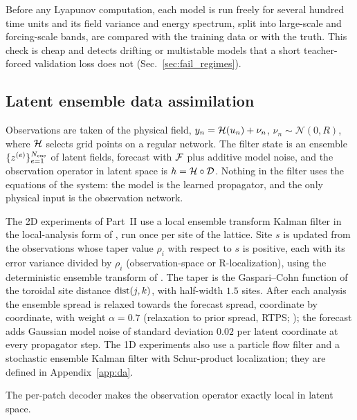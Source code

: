 Before any Lyapunov computation, each model is run freely for several
hundred time units and its field variance and energy spectrum, split
into large-scale and forcing-scale bands, are compared with the training
data or with the truth.
This check is cheap and detects drifting or multistable models that a
short teacher-forced validation loss does not (Sec.~\ref{sec:fail_regimes}).

\subsection{Latent ensemble data assimilation}
\label{sec:da_method}

Observations are taken of the physical field,
$y_n = \mathcal{H}(u_n) + \nu_n$, $\nu_n\sim\mathcal{N}(0,R)$, where $\mathcal{H}$
selects grid points on a regular network. The filter state is an
ensemble $\{z^{(e)}\}_{e=1}^{N_{\mathrm{ens}}}$ of latent fields, forecast with
$\mathcal{F}$ plus additive model noise, and the observation operator in latent
space is $h = \mathcal{H}\circ\mathcal{D}$. Nothing in the filter uses the equations
of the system: the model is the learned propagator, and the only
physical input is the observation network.

 The 2D experiments of Part~II use a local
ensemble transform Kalman filter in the local-analysis form of
\citet{hunt2007}, run once per site of the lattice. Site $s$ is updated
from the observations whose taper value $\rho_i$ with respect to $s$ is
positive, each with its error variance divided by $\rho_i$
(observation-space or R-localization), using the deterministic ensemble
transform of \citet{hunt2007}. The taper is the Gaspari--Cohn function
\citep{gaspari1999} of the toroidal site distance $\operatorname{dist}(j,k)$, with
half-width $1.5$ sites. After each analysis the ensemble spread is
relaxed towards the forecast spread, coordinate by coordinate, with
weight $\alpha=0.7$ (relaxation to prior spread, RTPS;
\citealp{whitakerhamill2012}); the forecast adds Gaussian model noise of
standard deviation $0.02$ per latent coordinate at every propagator
step. The 1D experiments also use a particle flow filter
\citep{huvanleeuwen2021} and a stochastic ensemble Kalman filter with
Schur-product localization; they are defined in Appendix~\ref{app:da}.

The per-patch decoder makes the observation operator exactly local in
latent space.

